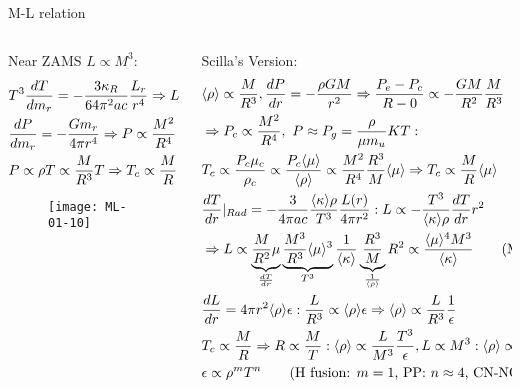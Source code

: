 \begin{frame}{M-L relation}
\begin{columns}[T]\begin{column}{0.4\textwidth}
Near ZAMS $L\propto M^3$:
\begin{align*}
    &T^3\TDy{m_r}{T}=-\frac{3\kappa_R}{64\pi^2ac}\frac{L_r}{r^4}\Rightarrow L\propto \frac{R^4}{M}T_c^4\\
    &\TDy{m_r}{P}=-\frac{Gm_r}{4\pi r^4}\Rightarrow P\propto \frac{M^2}{R^4}\\
    &P\propto\rho T\propto \frac{M}{R^3}T\Rightarrow T_c\propto \frac{M}{R}
\end{align*}
\begin{figure}[!ht]
\texttt{[image: ML-01-10]}\label{fig:ML-01-10}
\end{figure}
\end{column}
\begin{column}{0.6\textwidth}
Scilla's Version:
\begin{align*}
    &\exv{\rho}\propto \frac{M}{R^3},\TDy{r}{P}=-\frac{\rho GM}{r^2}\Rightarrow \frac{P_e-P_c}{R-0}\propto-\frac{GM}{R^2}\frac{M}{R^3}\\
    &\Rightarrow P_c\propto\frac{M^2}{R^4},\ P\approx P_g=\frac{\rho}{\mu m_u}KT:\\
    &T_c\propto \frac{P_c\mu_c}{\rho_c}\propto \frac{P_c\exv{\mu}}{\exv{\rho}}\propto\frac{M^2}{R^4}\frac{R^3}{M}\exv{\mu}\Rightarrow T_c\propto \frac{M}{R}\exv{\mu}\\
    &\TDy{r}{T}|_{Rad}=-\frac{3}{4\pi ac}\frac{\exv{\kappa}\rho}{T^3}\frac{L(r)}{4\pi r^2}: L\propto-\frac{T^3}{\exv{\kappa}\rho}\TDy{r}{T}r^2\\
    &\Rightarrow L\propto \underbrace{\frac{M}{R^2}\mu}_{\TDy{r}{T}}\underbrace{\frac{M^3}{R^3}\exv{\mu}^3}_{T^3}\frac{1}{\exv{\kappa}}\underbrace{\frac{R^3}{M}}_{\frac{1}{\exv{\rho}}}R^2\propto \frac{\exv{\mu}^4M^3}{\exv{\kappa}}\tag{M-L relation}\\
    &\TDy{r}{L}=4\pi r^2\exv{\rho}\epsilon: \frac{L}{R^3}\propto\exv{\rho}\epsilon\Rightarrow\exv{\rho}\propto \frac{L}{R^3}\frac{1}{\epsilon}\\
    &T_c\propto \frac{M}{R}\Rightarrow R\propto \frac{M}{T}: \exv{\rho}\propto \frac{L}{M^3}\frac{T^3}{\epsilon}, L\propto M^3: \exv{\rho}\propto \frac{T^3}{\epsilon}\\
    &\epsilon\propto\rho^mT^n\tag{H fusion: $m=1$, PP: $n\approx4$, CN-NO: $n\approx\numrange{15}{17}$}\\

\end{align*}
\end{column}
\end{columns}
\end{frame}
